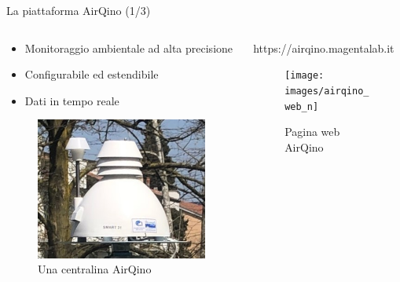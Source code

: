 \begin{frame}{La piattaforma AirQino (1/3)}
\begin{columns}

\begin{column}{0.45\textwidth}

\begin{itemize}
  \item Monitoraggio ambientale ad alta precisione
  \item Configurabile ed estendibile
  \item Dati in tempo reale
\end{itemize}\vspace{0.1cm}

\begin{figure}[H]
\centering
\captionsetup{justification=centering}
\includegraphics[width=.6\textwidth]{images/airqino_stazione}
\caption{Una centralina AirQino}
\end{figure}

\end{column}

\begin{column}{0.65\textwidth}

\begin{center}
\alert{https://airqino.magentalab.it}
\vspace{-0.3cm}
\begin{figure}[H]
\centering
\captionsetup{justification=centering}
\texttt{[image: images/airqino\_web\_n]}
\caption{Pagina web AirQino}
\end{figure}
\end{center}

\end{column}

\end{columns}
\end{frame}

